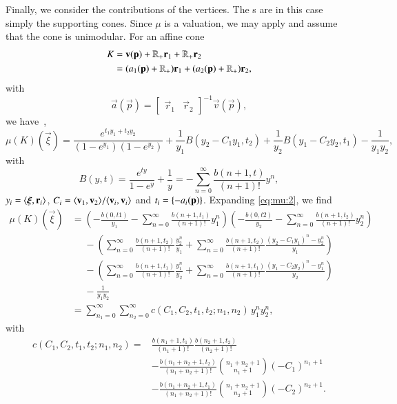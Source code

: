 Finally, we consider the contributions of the vertices.
The s are in this case simply the supporting cones.
Since $\mu$ is a valuation, we may apply 
and assume that the cone is unimodular.
For an affine cone
\begin{align*}
K &= \vec v(\vec p) + \RR_+ \vec r_1 + \RR_+ \vec r_2
\\
&= (a_1(\vec p) + \RR_+) \vec r_1 + (a_2(\vec p) + \RR_+) \vec r_2,
\end{align*}
with
$$
\vec a(\vec p) =
\begin{bmatrix}
\vec r_1 & \vec r_2
\end{bmatrix}^{-1}
\vec v(\vec p)
,
$$
we have~\cite[Proposition~31]{Berline2006local},
\begin{equation}
\label{eq:mu:2}
\mu(K)(\vec\xi)
=
\frac{e^{t_1 y_1 + t_2 y_2}}{(1-e^{y_1})(1-e^{y_2})}
+ \frac 1{y_1}B(y_2 - C_1 y_1, t_2)
+ \frac 1{y_2}B(y_1 - C_2 y_2, t_1)
- \frac 1{y_1 y_2},
\end{equation}
with
$$
B(y,t) =
\frac{e^{t y}}{1-e^y} + \frac 1{y}
= -\sum_{n=0}^\infty \frac{b(n+1, t)}{(n+1)!} y^n
,
$$
$y_i = \sps{\vec\xi}{\vec r_i}$,
$C_i = \sps{\vec v_1}{\vec v_2}/\sps{\vec v_i}{\vec v_i}$
and
$t_i = \fractional{-a_i(\vec p)}$.
Expanding \eqref{eq:mu:2}, we find
\begin{align*}
\mu(K)(\vec\xi)
& =
\left(
-\frac{b(0,t1)}{y_1} - \sum_{n=0}^\infty \frac{b(n+1,t_1)}{(n+1)!} y_1^n
\right)
\left(
-\frac{b(0,t2)}{y_2} - \sum_{n=0}^\infty \frac{b(n+1,t_2)}{(n+1)!} y_2^n
\right)
\\
& \phantom{=}
-
\left(
\sum_{n=0}^\infty \frac{b(n+1,t_2)}{(n+1)!} \frac{y_2^n}{y_1}
+
\sum_{n=0}^\infty \frac{b(n+1,t_2)}{(n+1)!} \frac{(y_2-C_1 y_1)^n-y_2^n}{y_1}
\right)
\\
& \phantom{=}
-
\left(
\sum_{n=0}^\infty \frac{b(n+1,t_1)}{(n+1)!} \frac{y_1^n}{y_2}
+
\sum_{n=0}^\infty \frac{b(n+1,t_1)}{(n+1)!} \frac{(y_1-C_2 y_2)^n-y_1^n}{y_2}
\right)
\\
& \phantom{=}
- \frac 1{y_1 y_2}
\\
& =
\sum_{n_1=0}^\infty
\sum_{n_2=0}^\infty
c(C_1, C_2, t_1, t_2; n_1, n_2) \, y_1^n y_2^n
,
\end{align*}
with
\begin{align*}
c(C_1, C_2, t_1, t_2; n_1, n_2)
= &
\frac{b(n_1+1,t_1)}{(n_1+1)!} \frac{b(n_2+1,t_2)}{(n_2+1)!}
\\
&
-
\frac{b(n_1+n_2+1,t_2)}{(n_1+n_2+1)!} {n_1+n_2+1 \choose n_1+1}
\left(-C_1\right)^{n_1+1}
\\
&
-
\frac{b(n_1+n_2+1,t_1)}{(n_1+n_2+1)!} {n_1+n_2+1 \choose n_2+1}
\left(-C_2\right)^{n_2+1}
.
\end{align*}
